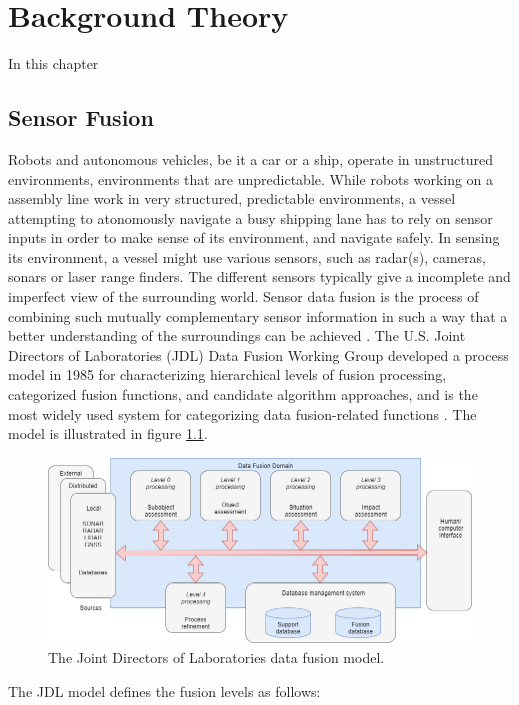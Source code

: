 
\chapter{Background Theory}
In this chapter 
\section{Sensor Fusion}
\label{section:fusion}
Robots and autonomous vehicles, be it a car or a ship, operate in unstructured environments, environments that are unpredictable. While robots working on a assembly line work in very structured, predictable environments, a vessel attempting to atonomously navigate a busy shipping lane has to rely on sensor inputs in order to make sense of its environment, and navigate safely. In sensing its environment, a vessel might use various sensors, such as radar(s), cameras, sonars or laser range finders. The different sensors typically give a incomplete and imperfect view of the surrounding world. Sensor data fusion is the process of combining such mutually complementary sensor information in such a way that a better understanding of the surroundings can be achieved \cite{sensorFusion1}.
The U.S. Joint Directors of Laboratories (JDL) Data Fusion Working Group developed a process model in 1985 for characterizing hierarchical levels of fusion processing, categorized fusion functions, and candidate algorithm approaches, and is the most widely used system for categorizing data fusion-related functions \cite{JDLFusion}. The model is illustrated in figure \ref{fig:jdl_fusion}.
\begin{figure}[H]
    \centering
    \includegraphics[width=.8\linewidth]{fig/JDLfusion.png}
    \caption{The Joint Directors of Laboratories data fusion model.}
    \label{fig:jdl_fusion}
\end{figure}
The JDL model defines the fusion levels as follows:
